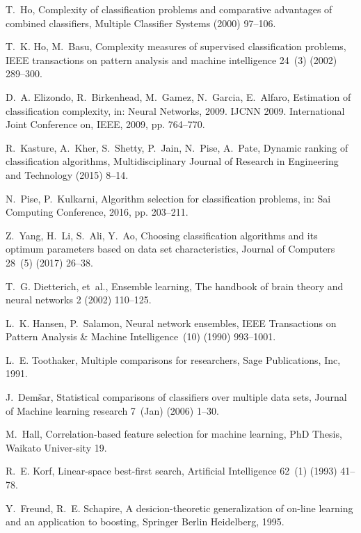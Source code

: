 \documentclass[review,3p,twocolumn,times]{elsarticle}
\begin{document}
\begin{thebibliography}{10}
	T.~Ho, Complexity of classification problems and comparative advantages of
	combined classifiers, Multiple Classifier Systems (2000) 97--106.
	
	T.~K. Ho, M.~Basu, Complexity measures of supervised classification problems,
	IEEE transactions on pattern analysis and machine intelligence 24~(3) (2002)
	289--300.
	
	D.~A. Elizondo, R.~Birkenhead, M.~Gamez, N.~Garcia, E.~Alfaro, Estimation of
	classification complexity, in: Neural Networks, 2009. IJCNN 2009.
	International Joint Conference on, IEEE, 2009, pp. 764--770.
	
	R.~Kasture, A.~Kher, S.~Shetty, P.~Jain, N.~Pise, A.~Pate, Dynamic ranking of
	classification algorithms, Multidisciplinary Journal of Research in
	Engineering and Technology (2015) 8--14.
	
	N.~Pise, P.~Kulkarni, Algorithm selection for classification problems, in: Sai
	Computing Conference, 2016, pp. 203--211.
	
	Z.~Yang, H.~Li, S.~Ali, Y.~Ao, Choosing classification algorithms and its
	optimum parameters based on data set characteristics, Journal of Computers
	28~(5) (2017) 26--38.
	
	T.~G. Dietterich, et~al., Ensemble learning, The handbook of brain theory and
	neural networks 2 (2002) 110--125.
	
	L.~K. Hansen, P.~Salamon, Neural network ensembles, IEEE Transactions on
	Pattern Analysis \& Machine Intelligence~(10) (1990) 993--1001.
	
	L.~E. Toothaker, Multiple comparisons for researchers, Sage Publications, Inc,
	1991.
	
	J.~Demšar, Statistical comparisons of classifiers over multiple data sets,
	Journal of Machine learning research 7~(Jan) (2006) 1--30.
	
	M.~Hall, Correlation-based feature selection for machine learning, PhD Thesis,
	Waikato Univer-sity 19.
	
	R.~E. Korf, Linear-space best-first search, Artificial Intelligence 62~(1)
	(1993) 41--78.
	
	Y.~Freund, R.~E. Schapire, A desicion-theoretic generalization of on-line
	learning and an application to boosting, Springer Berlin Heidelberg, 1995.
	

\end{thebibliography}
\end{document}
